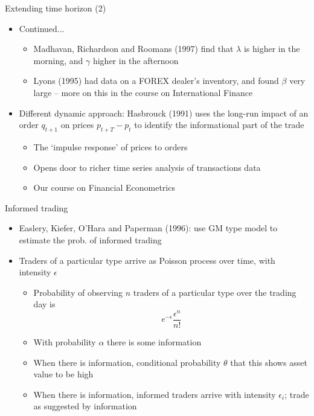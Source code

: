 \documentclass[english,10pt]{beamer}
\begin{document}
\begin{frame}{Extending time horizon (2)}
	\begin{itemize}
		\item Continued...
		\begin{itemize}
			\item Madhavan, Richardson and Roomans (1997) find that $\lambda$ is higher in the morning, and $\gamma$ higher in the afternoon
			\item Lyons (1995) had data on a FOREX dealer's inventory, and found $\beta$ very large -- more on this in the course on International Finance
		\end{itemize}
		\item Different dynamic approach: Hasbrouck (1991) uses the long-run impact of an order $q_{t+1}$ on prices $p_{t+T}-p_t$ to identify the informational part of the trade
		\begin{itemize}
			\item The `impulse response' of prices to orders
			\item Opens door to richer time series analysis of transactions data
			\item Our course on Financial Econometrics
		\end{itemize}
	\end{itemize}
\end{frame}


\begin{frame}{Informed trading}
	\begin{itemize}
		\item Easlery, Kiefer, O'Hara and Paperman (1996): use GM type model to estimate the prob. of informed trading
		\item Traders of a particular type arrive as Poisson process over time, with intensity $\epsilon$
		\begin{itemize}
			\item Probability of observing $n$ traders of a particular type over the trading day is
			\[
			e^{-\epsilon} \frac{\epsilon^n}{n!}
			\]
			\item With probability $\alpha$ there is some information
			\item When there is information, conditional probability $\theta$ that this shows asset value to be high
			\item When there is information, informed traders arrive with intensity $\epsilon_i$; trade as suggested by information
		\end{itemize}
	\end{itemize}
\end{frame}
\end{document}
